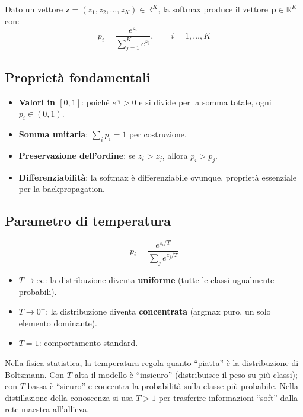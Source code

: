 \documentclass[
  11pt,
]{article}
\begin{document}
\begin{formulabox}[title={\textbf{Definizione della Softmax}}]
Dato un vettore $\mathbf{z} = (z_1, z_2, \ldots, z_K) \in \mathbb{R}^K$, la softmax produce il vettore $\mathbf{p} \in \mathbb{R}^K$ con:
\[
p_i = \frac{e^{z_i}}{\sum_{j=1}^{K} e^{z_j}}, \qquad i = 1, \ldots, K
\]
\end{formulabox}

\subsection{Proprietà fondamentali}

\begin{itemize}
  \item \textbf{Valori in $[0,1]$}: poiché $e^{z_i} > 0$ e si divide per la somma totale, ogni $p_i \in (0,1)$.
  \item \textbf{Somma unitaria}: $\sum_i p_i = 1$ per costruzione.
  \item \textbf{Preservazione dell'ordine}: se $z_i > z_j$, allora $p_i > p_j$.
  \item \textbf{Differenziabilità}: la softmax è differenziabile ovunque, proprietà essenziale per la backpropagation.
\end{itemize}

\subsection{Parametro di temperatura}

\begin{formulabox}[title={\textbf{Softmax con temperatura $T$}}]
\[
p_i = \frac{e^{z_i / T}}{\sum_{j} e^{z_j / T}}
\]
\end{formulabox}

\begin{itemize}
  \item $T \to \infty$: la distribuzione diventa \textbf{uniforme} (tutte le classi ugualmente probabili).
  \item $T \to 0^+$: la distribuzione diventa \textbf{concentrata} (argmax puro, un solo elemento dominante).
  \item $T = 1$: comportamento standard.
\end{itemize}

\begin{notabox}[title={\textbf{Intuizione: temperatura come ``incertezza''}}]
Nella fisica statistica, la temperatura regola quanto ``piatta'' è la distribuzione di Boltzmann. Con $T$ alta il modello è ``insicuro'' (distribuisce il peso su più classi); con $T$ bassa è ``sicuro'' e concentra la probabilità sulla classe più probabile. Nella distillazione della conoscenza si usa $T > 1$ per trasferire informazioni ``soft'' dalla rete maestra all'allieva.
\end{notabox}
\end{document}

